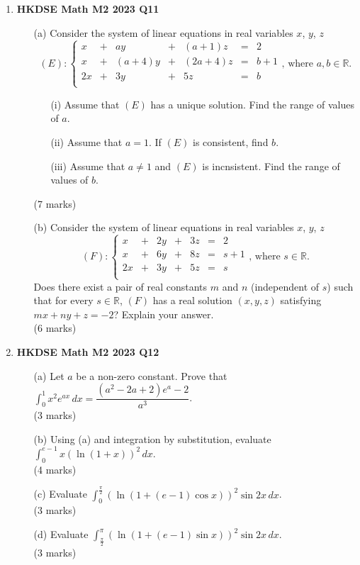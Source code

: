 \documentclass[12pt]{article}
\begin{document}
\begin{enumerate}
	\item \textbf{HKDSE Math M2 2023 Q11}
	\begin{enumerate}
		\item [(a)] Consider the system of linear equations in real variables $x$, $y$, $z$
		$$(E) : \left\{\begin{matrix}
		x&	+&	ay&		+&	(a+1)z&		=&	2  \\
		x&	+&	(a+4)y&	+&	(2a+4)z&	=&	b+1 \\
		2x&	+&	3y&		+&	5z&			=&	b \\
		\end{matrix}\right. \text{,  where } a, b \in \mathbb{R} .$$
		\begin{enumerate}
			\item [(i)] Assume that $(E)$ has a unique solution. Find the range of values of $a$.
			\item [(ii)] Assume that $a = 1$. If $(E)$ is consistent, find $b$.
			\item [(iii)] Assume that $a \neq 1$ and $(E)$ is incnsistent. Find the range of values of $b$.
		\end{enumerate}
		(7 marks)
		\item [(b)] Consider the system of linear equations in real variables $x$, $y$, $z$
		$$(F) : \left\{\begin{matrix}
		x&	+&	2y&	+&	3z&	=&	2  \\
		x&	+&	6y&	+&	8z&	=&	s+1 \\
		2x&	+&	3y&	+&	5z&	=&	s \\
		\end{matrix}\right. \text{,  where } s \in \mathbb{R} .$$
		Does there exist a pair of real constants $m$ and $n$ (independent of $s$) such that for every $s\in\mathbb{R}$, $(F)$ has a real solution $(x,y,z)$ satisfying $mx + ny + z = -2$? Explain your answer. \\(6 marks) 
	\end{enumerate}



	\item \textbf{HKDSE Math M2 2023 Q12}
	\begin{enumerate}
		\item [(a)]Let $a$ be a non-zero constant. Prove that $\displaystyle \int _{0}^{1} x^2e^{ax} \,dx = \dfrac{(a^2 - 2a + 2)e^a - 2}{a^3}$. \\(3 marks)		
		\item [(b)]Using (a) and integration by substitution, evaluate $\displaystyle \int _{0}^{e-1} x(\ln{(1+x)})^2 \,dx $. \\(4 marks)		
		\item [(c)]Evaluate $\displaystyle \int _{0}^{\frac{\pi}{2}} (\ln{(1+(e-1)\cos{x})})^2\sin{2x} \,dx $. \\(3 marks)
		\item [(d)]Evaluate $\displaystyle \int _{\frac{\pi}{2}}^{\pi} (\ln{(1+(e-1)\sin{x})})^2\sin{2x} \,dx $. \\(3 marks)

	\end{enumerate}




\end{enumerate}
\end{document}
